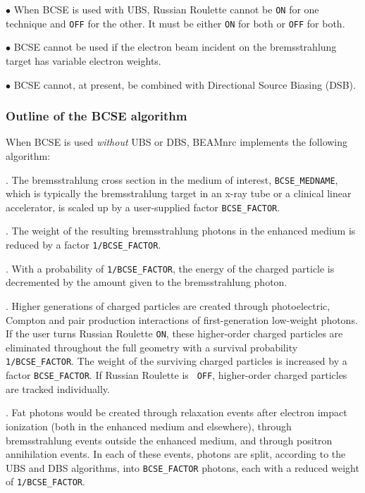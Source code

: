 \documentclass[12pt,twoside]{article}
\begin{document}
\noindent $\bullet$ When BCSE is used with UBS, Russian Roulette
cannot be {\tt ON} for one technique and {\tt OFF} for the other. It
must be either {\tt ON} for both or {\tt OFF} for both.

\noindent $\bullet$ BCSE cannot be used if the electron beam incident
on the bremsstrahlung target has variable electron weights.

\noindent $\bullet$ BCSE cannot, at present, be combined with
Directional Source Biasing (DSB).

\subsubsection{Outline of the BCSE algorithm}

When BCSE is used {\em without} UBS or DBS, BEAMnrc implements the following
algorithm\cite{AR07}:

. The bremsstrahlung cross section in the medium of
interest, {\tt BCSE\_MEDNAME}, which is typically the bremsstrahlung target in
an x-ray tube or a clinical linear accelerator,
is scaled up by a user-supplied factor {\tt BCSE\_FACTOR}.

. The weight of the resulting bremsstrahlung photons in the
enhanced medium is reduced by a factor {\tt 1/BCSE\_FACTOR}.

. With a probability of {\tt 1/BCSE\_FACTOR}, the energy of
the charged particle is decremented by the amount given to the
bremsstrahlung photon.

. Higher generations of charged particles are created
through photoelectric, Compton and pair production interactions of
first-generation low-weight photons. If the user turns Russian
Roulette {\tt ON}, these higher-order charged particles are eliminated
throughout the full geometry with a survival probability {\tt
1/BCSE\_FACTOR}. The weight of the surviving charged particles is
increased by a factor {\tt BCSE\_FACTOR}. If Russian Roulette is {\tt
OFF}, higher-order charged particles are tracked individually.

. Fat photons would be created through relaxation events
after electron impact ionization (both in the enhanced medium and
elsewhere), through bremsstrahlung events outside the enhanced medium,
and through positron annihilation events. In each of these events, photons
are split,
according to the UBS and DBS algorithms, into {\tt BCSE\_FACTOR}
photons, each with a reduced weight of {\tt 1/BCSE\_FACTOR}.
\end{document}
